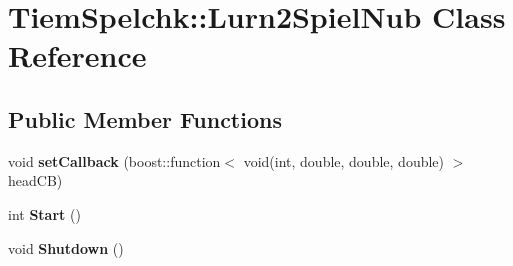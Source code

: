 \hypertarget{class_tiem_spelchk_1_1_lurn2_spiel_nub}{\section{Tiem\-Spelchk\-:\-:Lurn2\-Spiel\-Nub Class Reference}
\label{class_tiem_spelchk_1_1_lurn2_spiel_nub}
}
\subsection*{Public Member Functions}
\begin{DoxyCompactItemize}
\item 
\hypertarget{class_tiem_spelchk_1_1_lurn2_spiel_nub_a590dbbc3cfd3781cc79e63945d6bdce9}{void {\bfseries set\-Callback} (boost\-::function$<$ void(int, double, double, double) $>$ head\-C\-B)}\label{class_tiem_spelchk_1_1_lurn2_spiel_nub_a590dbbc3cfd3781cc79e63945d6bdce9}

\item 
\hypertarget{class_tiem_spelchk_1_1_lurn2_spiel_nub_a29b93d8ad5bbcefad6df00b4a23f4fc4}{int {\bfseries Start} ()}\label{class_tiem_spelchk_1_1_lurn2_spiel_nub_a29b93d8ad5bbcefad6df00b4a23f4fc4}

\item 
\hypertarget{class_tiem_spelchk_1_1_lurn2_spiel_nub_a7c055489ec5c140e7bfa91a0c0a76f94}{void {\bfseries Shutdown} ()}\label{class_tiem_spelchk_1_1_lurn2_spiel_nub_a7c055489ec5c140e7bfa91a0c0a76f94}

\end{DoxyCompactItemize}
